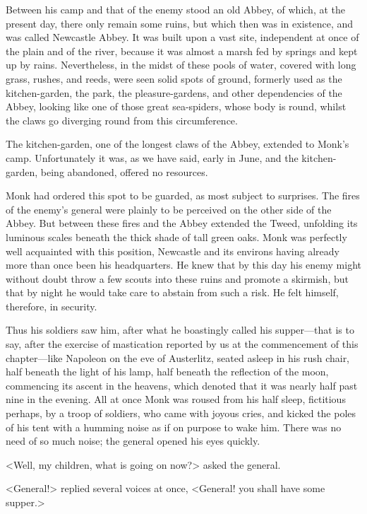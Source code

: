 Between his camp and that of the enemy stood an old Abbey, of which, at the present day, there only remain some ruins, but which then was in existence, and was called Newcastle Abbey. It was built upon a vast site, independent at once of the plain and of the river, because it was almost a marsh fed by springs and kept up by rains. Nevertheless, in the midst of these pools of water, covered with long grass, rushes, and reeds, were seen solid spots of ground, formerly used as the kitchen-garden, the park, the pleasure-gardens, and other dependencies of the Abbey, looking like one of those great sea-spiders, whose body is round, whilst the claws go diverging round from this circumference.

The kitchen-garden, one of the longest claws of the Abbey, extended to Monk's camp. Unfortunately it was, as we have said, early in June, and the kitchen-garden, being abandoned, offered no resources.

Monk had ordered this spot to be guarded, as most subject to surprises. The fires of the enemy's general were plainly to be perceived on the other side of the Abbey. But between these fires and the Abbey extended the Tweed, unfolding its luminous scales beneath the thick shade of tall green oaks. Monk was perfectly well acquainted with this position, Newcastle and its environs having already more than once been his headquarters. He knew that by this day his enemy might without doubt throw a few scouts into these ruins and promote a skirmish, but that by night he would take care to abstain from such a risk. He felt himself, therefore, in security.

Thus his soldiers saw him, after what he boastingly called his supper—that is to say, after the exercise of mastication reported by us at the commencement of this chapter—like Napoleon on the eve of Austerlitz, seated asleep in his rush chair, half beneath the light of his lamp, half beneath the reflection of the moon, commencing its ascent in the heavens, which denoted that it was nearly half past nine in the evening. All at once Monk was roused from his half sleep, fictitious perhaps, by a troop of soldiers, who came with joyous cries, and kicked the poles of his tent with a humming noise as if on purpose to wake him. There was no need of so much noise; the general opened his eyes quickly.

<Well, my children, what is going on now?> asked the general.

<General!> replied several voices at once, <General! you shall have some supper.>

